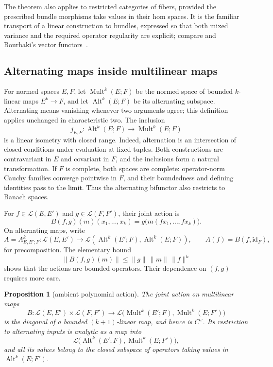 \documentclass[11pt]{amsart}
\newtheorem{proposition}[theorem]{Proposition}
\theoremstyle{definition}
\theoremstyle{remark}
\numberwithin{equation}{section}
\newcommand{\cL}{\mathcal L}
\newcommand{\Alt}{\operatorname{Alt}}
\newcommand{\Mult}{\operatorname{Mult}}
\newcommand{\id}{\mathrm{id}}
\newcommand{\norm}[1]{\lVert #1\rVert}
\begin{document}
The theorem also applies to restricted categories of fibers, provided the prescribed bundle morphisms take values in their hom spaces. It is the familiar transport of a linear construction to bundles, expressed so that both mixed variance and the required operator regularity are explicit; compare \cite{G2,La} and Bourbaki's vector functors~\cite[n\textsuperscript{os}~7.6.1--7.6.4]{Bou}.

\subsection{Alternating maps inside multilinear maps}

For normed spaces $E,F$, let $\Mult^k(E;F)$ be the normed space of bounded $k$-linear maps $E^k\to F$, and let $\Alt^k(E;F)$ be its alternating subspace. Alternating means vanishing whenever two arguments agree; this definition applies unchanged in characteristic two. The inclusion
\[
 j_{E,F}\colon\Alt^k(E;F)\longrightarrow\Mult^k(E;F)
\]
is a linear isometry with closed range. Indeed, alternation is an intersection of closed conditions under evaluation at fixed tuples. Both constructions are contravariant in $E$ and covariant in $F$, and the inclusions form a natural transformation. If $F$ is complete, both spaces are complete: operator-norm Cauchy families converge pointwise in $F$, and their boundedness and defining identities pass to the limit. Thus the alternating bifunctor also restricts to Banach spaces.

For $f\in\cL(E,E')$ and $g\in\cL(F,F')$, their joint action is
\[
 B(f,g)(m)(x_1,\ldots,x_k)
 =g\bigl(m(fx_1,\ldots,fx_k)\bigr).
\]
On alternating maps, write
\[
 A=A^k_{E,E';F}\colon\cL(E,E')\longrightarrow
 \cL(\Alt^k(E';F),\Alt^k(E;F)),\qquad A(f)=B(f,\id_F),
\]
for precomposition. The elementary bound
\[
 \norm{B(f,g)(m)}\le\norm g\,\norm m\,\norm f^k
\]
shows that the actions are bounded operators. Their dependence on $(f,g)$ requires more care.

\begin{proposition}[ambient polynomial action]\label{prop:ambient-polynomial}
The joint action on multilinear maps
\[
 B\colon\cL(E,E')\times\cL(F,F')
 \longrightarrow\cL\bigl(\Mult^k(E';F),\Mult^k(E;F')\bigr)
\]
is the diagonal of a bounded $(k+1)$-linear map, and hence is $C^\omega$. Its restriction to alternating inputs is analytic as a map into
\[
 \cL\bigl(\Alt^k(E';F),\Mult^k(E;F')\bigr),
\]
and all its values belong to the closed subspace of operators taking values in $\Alt^k(E;F')$.
\end{proposition}
\end{document}
